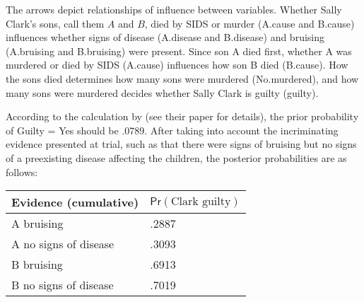 \documentclass{article}
\newcommand{\pr}{\mathsf{Pr}}
\begin{document}
\noindent
%
The arrows depict relationships of influence between variables. Whether Sally Clark's sons, call them \(A\) and \(B\), died by SIDS or murder (\textsf{A.cause} and \textsf{B.cause}) influences whether signs of disease (\textsf{A.disease} and \textsf{B.disease}) and bruising (\textsf{A.bruising} and \textsf{B.bruising})  were present. %
Since son A died first, whether A was murdered or died by SIDS (\textsf{A.cause}) influences how son B died (\textsf{B.cause}). 
How the sons died %
determines how many sons were murdered (\textsf{No.murdered}), and how many sons were murdered decides whether Sally Clark is guilty (\textsf{guilty}). 


According to the calculation by \cite{Fenton2018Risk} (see their paper for details), the prior probability of \textrm{Guilty = Yes} should be .0789. After taking into account the incriminating evidence presented at trial, such as that there were signs of bruising but no signs of a preexisting disease affecting the children, the posterior probabilities are as follows:

\begin{center}
\begin{tabular}{@{}ll@{}}
\toprule
Evidence (cumulative) & $\pr(\textrm{Clark guilty})$ 
\\ \midrule 
A bruising& .2887\\
A no signs of disease & .3093\\
B bruising & .6913\\
B no signs of disease  & .7019\\
 \bottomrule
\end{tabular}
\end{center}
\end{document}
